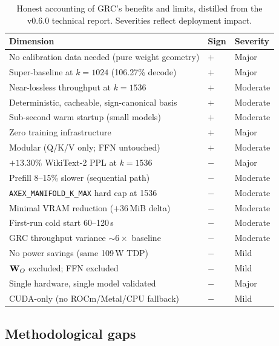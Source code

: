 \documentclass[11pt]{article}
\begin{document}
\begin{table}[h]\centering\footnotesize
\caption{Honest accounting of GRC's benefits and limits, distilled from the
v0.6.0 technical report. Severities reflect deployment impact.}
\begin{tabular}{@{}lll@{}}
\toprule
\textbf{Dimension} & \textbf{Sign} & \textbf{Severity}\\
\midrule
No calibration data needed (pure weight geometry)  & $+$ & Major\\
Super-baseline at $k{=}1024$ (106.27\% decode)     & $+$ & Major\\
Near-lossless throughput at $k{=}1536$             & $+$ & Moderate\\
Deterministic, cacheable, sign-canonical basis     & $+$ & Moderate\\
Sub-second warm startup (small models)             & $+$ & Moderate\\
Zero training infrastructure                       & $+$ & Major\\
Modular (Q/K/V only; FFN untouched)                & $+$ & Moderate\\
\midrule
$+13.30\%$ WikiText-2 PPL at $k{=}1536$            & $-$ & Major\\
Prefill 8--15\% slower (sequential path)           & $-$ & Moderate\\
\texttt{AXEX\_MANIFOLD\_K\_MAX} hard cap at 1536   & $-$ & Moderate\\
Minimal VRAM reduction ($+36$\,MiB delta)          & $-$ & Moderate\\
First-run cold start 60--120\,s                    & $-$ & Moderate\\
GRC throughput variance ${\sim}6\times$ baseline   & $-$ & Moderate\\
No power savings (same 109\,W TDP)                 & $-$ & Mild\\
$\mathbf{W}_O$ excluded; FFN excluded                   & $-$ & Mild\\
Single hardware, single model validated            & $-$ & Major\\
CUDA-only (no ROCm/Metal/CPU fallback)             & $-$ & Mild\\
\bottomrule
\end{tabular}
\end{table}

\subsection{Methodological gaps}
\end{document}
